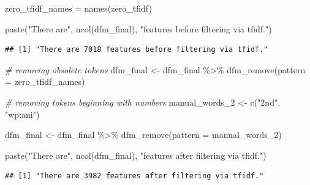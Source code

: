 \documentclass[
]{article}
\newenvironment{Shaded}{\begin{snugshade}}{\end{snugshade}}
\newcommand{\AttributeTok}[1]{\textcolor[rgb]{0.77,0.63,0.00}{#1}}
\newcommand{\CommentTok}[1]{\textcolor[rgb]{0.56,0.35,0.01}{\textit{#1}}}
\newcommand{\DocumentationTok}[1]{\textcolor[rgb]{0.56,0.35,0.01}{\textbf{\textit{#1}}}}
\newcommand{\FunctionTok}[1]{\textcolor[rgb]{0.00,0.00,0.00}{#1}}
\newcommand{\NormalTok}[1]{#1}
\newcommand{\OtherTok}[1]{\textcolor[rgb]{0.56,0.35,0.01}{#1}}
\newcommand{\SpecialCharTok}[1]{\textcolor[rgb]{0.00,0.00,0.00}{#1}}
\newcommand{\StringTok}[1]{\textcolor[rgb]{0.31,0.60,0.02}{#1}}
\begin{document}
\begin{Shaded}
\begin{Highlighting}[]
\NormalTok{zero\_tfidf\_names }\OtherTok{=} \FunctionTok{names}\NormalTok{(zero\_tfidf)}

\FunctionTok{paste}\NormalTok{(}\StringTok{"There are"}\NormalTok{, }\FunctionTok{ncol}\NormalTok{(dfm\_final), }\StringTok{"features before filtering via tfidf."}\NormalTok{)}
\end{Highlighting}
\end{Shaded}

\begin{verbatim}
## [1] "There are 7018 features before filtering via tfidf."
\end{verbatim}

\begin{Shaded}
\begin{Highlighting}[]
\CommentTok{\# removing obsolete tokens}
\NormalTok{dfm\_final }\OtherTok{\textless{}{-}}\NormalTok{ dfm\_final }\SpecialCharTok{\%\textgreater{}\%}
  \FunctionTok{dfm\_remove}\NormalTok{(}\AttributeTok{pattern =}\NormalTok{ zero\_tfidf\_names)}

\CommentTok{\# removing tokens beginning with numbers}
\NormalTok{manual\_words\_2 }\OtherTok{\textless{}{-}} \FunctionTok{c}\NormalTok{(}\StringTok{"2nd"}\NormalTok{, }\StringTok{"wp:ani"}\NormalTok{)}

\NormalTok{dfm\_final }\OtherTok{\textless{}{-}}\NormalTok{ dfm\_final }\SpecialCharTok{\%\textgreater{}\%}
  \FunctionTok{dfm\_remove}\NormalTok{(}\AttributeTok{pattern =}\NormalTok{ manual\_words\_2)}

\FunctionTok{paste}\NormalTok{(}\StringTok{"There are"}\NormalTok{, }\FunctionTok{ncol}\NormalTok{(dfm\_final), }\StringTok{"features after filtering via tfidf."}\NormalTok{)}
\end{Highlighting}
\end{Shaded}

\begin{verbatim}
## [1] "There are 3982 features after filtering via tfidf."
\end{verbatim}

\begin{Shaded}
\end{Shaded}
\end{document}
